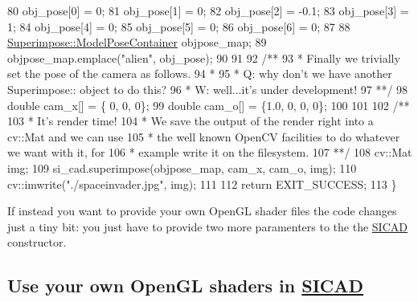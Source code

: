 \begin{DoxyCodeInclude}
80     obj\_pose[0] = 0;
81     obj\_pose[1] = 0;
82     obj\_pose[2] = -0.1;
83     obj\_pose[3] = 1;
84     obj\_pose[4] = 0;
85     obj\_pose[5] = 0;
86     obj\_pose[6] = 0;
87 
88     \mbox{\hyperlink{classSuperimpose_a178e3d4e2def6635bfcf9454dd4b5d22}{Superimpose::ModelPoseContainer}} objpose\_map;
89     objpose\_map.emplace(\textcolor{stringliteral}{"alien"}, obj\_pose);
90 
91 \textcolor{comment}{}
92 \textcolor{comment}{    /**}
93 \textcolor{comment}{     * Finally we trivially set the pose of the camera as follows.}
94 \textcolor{comment}{     *}
95 \textcolor{comment}{     * Q: why don't we have another Superimpose:: object to do this?}
96 \textcolor{comment}{     * W: well...it's under development!}
97 \textcolor{comment}{     **/}
98     \textcolor{keywordtype}{double} cam\_x[] = \{  0, 0, 0\};
99     \textcolor{keywordtype}{double} cam\_o[] = \{1.0, 0, 0, 0\};
100 
101 \textcolor{comment}{}
102 \textcolor{comment}{    /**}
103 \textcolor{comment}{     * It's render time!}
104 \textcolor{comment}{     * We save the output of the render right into a cv::Mat and we can use}
105 \textcolor{comment}{     * the well known OpenCV facilities to do whatever we want with it, for}
106 \textcolor{comment}{     * example write it on the filesystem.}
107 \textcolor{comment}{     **/}
108     cv::Mat img;
109     si\_cad.superimpose(objpose\_map, cam\_x, cam\_o, img);
110     cv::imwrite(\textcolor{stringliteral}{"./spaceinvader.jpg"}, img);
111 
112     \textcolor{keywordflow}{return} EXIT\_SUCCESS;
113 \}
\end{DoxyCodeInclude}


If instead you want to provide your own Open\+GL shader files the code changes just a tiny bit\+: you just have to provide two more paramenters to the the \mbox{\hyperlink{classSICAD}{S\+I\+C\+AD}} constructor.

\subsection*{Use your own Open\+GL shaders in \mbox{\hyperlink{classSICAD}{S\+I\+C\+AD}}}





